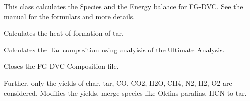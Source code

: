\documentclass[letterpaper,10pt,english]{sphinxmanual}
\begin{document}
\begin{fulllineitems}
\label{FGDVCClasses:Compos_and_Energy.FGDVC_SpeciesBalance}
This class calculates the Species and the Energy balance for FG-DVC. See the manual for the formulars and more details.

\begin{fulllineitems}
\label{FGDVCClasses:Compos_and_Energy.FGDVC_SpeciesBalance._FGDVC_SpeciesBalance__EnergyBalance}
Calculates the heat of formation of tar.

\end{fulllineitems}


\begin{fulllineitems}
\label{FGDVCClasses:Compos_and_Energy.FGDVC_SpeciesBalance._FGDVC_SpeciesBalance__TarComp}
Calculates the Tar composition using analyisis of the Ultimate Analysis.

\end{fulllineitems}


\begin{fulllineitems}
\label{FGDVCClasses:Compos_and_Energy.FGDVC_SpeciesBalance._FGDVC_SpeciesBalance__closeFile}
Closes the FG-DVC Composition file.

\end{fulllineitems}


\begin{fulllineitems}
\label{FGDVCClasses:Compos_and_Energy.FGDVC_SpeciesBalance._FGDVC_SpeciesBalance__correctYields}
Further, only the yields of char, tar, CO, CO2, H2O, CH4, N2, H2, O2 are considered. Modifies the yields, merge species like Olefins parafins, HCN to tar.


\end{fulllineitems}
\end{fulllineitems}
\end{document}
